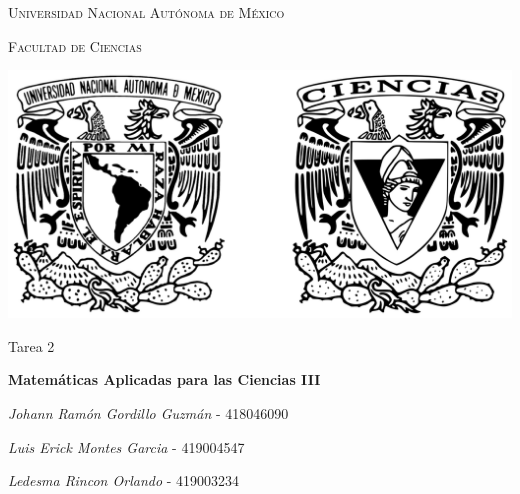 \documentclass[10pt,letterpaper,fleqn]{article}
\begin{document}
\begin{titlepage}
    \centering

    {\scshape\LARGE Universidad Nacional Autónoma de México \par}

    \vspace{1cm}
    
    {\scshape\Large Facultad de Ciencias\par}

    \vspace{1.5cm}

    \begin{center}
        \includegraphics[scale=.17]{../../assets/img/logo.png}
    \end{center}

    \vspace{1 cm}

    {\LARGE Tarea 2 \par}
    
    \vspace{.3cm}
    
    {\huge\bfseries Matemáticas Aplicadas para las Ciencias III \par}

	\vspace{1.3cm}

    \large{\itshape{Johann Ramón Gordillo Guzmán}} \small{ - 418046090} \\
    
    \vspace{1cm}
	
	\large{\itshape{Luis Erick Montes Garcia}} \small{ - 419004547} \\    
    
	\vspace{1cm}    
    
    \large{\itshape{Ledesma Rincon Orlando}} \small{ - 419003234} \\


\end{titlepage}
\end{document}
